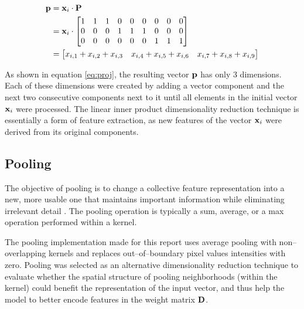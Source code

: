 \begin{equation} \label{eq:proj}
    \begin{split}
        \boldsymbol{\mathbf{p}} 
        &= 
            \boldsymbol{\mathbf{x}}_{i} \cdot \boldsymbol{\mathbf{P}} \\
        &=
            \boldsymbol{\mathbf{x}}_{i} \cdot
            \begin{bmatrix}
                1 & 1 & 1 & 0 & 0 & 0 & 0 & 0 & 0 \\
                0 & 0 & 0 & 1 & 1 & 1 & 0 & 0 & 0 \\
                0 & 0 & 0 & 0 & 0 & 0 & 1 & 1 & 1 \\
            \end{bmatrix} \\  
        &=
            \begin{bmatrix}
                x_{i,1} + x_{i,2} + x_{i,3} & x_{i,4} + x_{i,5} + x_{i,6} & x_{i,7} + x_{i,8} + x_{i,9}
            \end{bmatrix} \\
    \end{split}
\end{equation}

As shown in equation \ref{eq:proj}, the resulting vector $\boldsymbol{\mathbf{p}}$ has only 3 dimensions. Each of these dimensions were created by adding a vector component and the next two consecutive components next to it until all elements in the initial vector $\boldsymbol{\mathbf{x}}_i$ were processed. The linear inner product dimensionality reduction technique is essentially a form of feature extraction, as new features of the vector $\boldsymbol{\mathbf{x}}_i$ were derived from its original components.

\subsection{Pooling} \label{sect:theory:dim-reduction:pooling}

The objective of pooling is to change a collective feature representation into a new, more usable one that maintains important information while eliminating irrelevant detail \cite{article:pooling}. The pooling operation is typically a sum, average, or a max operation performed within a kernel. \newline

The pooling implementation made for this report uses average pooling with non--overlapping kernels and replaces out--of--boundary pixel values intensities with zero. Pooling was selected as an alternative dimensionality reduction technique to evaluate whether the spatial structure of pooling neighborhoods (within the kernel) could benefit the representation of the input vector, and thus help the model to better encode features in the weight matrix $\boldsymbol{\mathbf{D}}$. \newline


